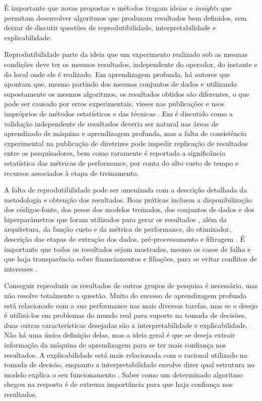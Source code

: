 É importante que novas propostas e métodos tragam ideias e \textit{insights} que permitam desenvolver algoritmos que produzam resultados bem definidos, sem deixar de discutir questões de reprodutibilidade, interpretabilidade e explicabilidade.

Reprodutibilidade parte da ideia que um experimento realizado sob as mesmas condições deve ter os mesmos resultados, independente do operador, do instante e do local onde ele é realizado. Em aprendizagem profunda, há autores que apontam que, mesmo partindo dos mesmos conjuntos de dados e utilizando supostamente os mesmos algoritmos, os resultados obtidos são diferentes, o que pode ser causado por erros experimentais, vieses nas publicações e usos impróprios de métodos estatísticos e das técnicas  \cite{Greengard2019}.   Em \cite{Belthangady2019} é discutido como a validação independente de resultados deveria ser natural nas áreas de aprendizado de máquina e aprendizagem profunda, mas a falta de consistência experimental na publicação de diretrizes pode impedir replicação de resultados entre os pesquisadores, bem como raramente é reportada a significância estatística das métricas de performance, por conta do alto custo de tempo e recursos associados à etapa de treinamento. 

A falta de reprodutibilidade pode ser amenizada com a descrição detalhada da metodologia e obtenção dos resultados. Boas práticas incluem a disponibilização dos códigos-fonte, dos pesos dos modelos treinados, dos conjuntos de dados e dos hiperparâmetros que foram utilizados para gerar os resultados  \cite{Belthangady2019, Greengard2019,  watson2021systematic}, além da arquitetura, da função custo e da métrica de performance, do otimizador, descrição das etapas de extração dos dados, pré-processamento e filtragem \cite{watson2021systematic}. É importante que todos os resultados sejam mostrados, mesmo os casos de falha \cite{Belthangady2019} e que haja transparência sobre financiamentos e filiações, para se evitar conflitos de interesses \cite{Greengard2019}.

Conseguir reproduzir os resultados de outros grupos de pesquisa é necessário, mas não resolve totalmente a questão. Muito do sucesso de aprendizagem profunda está relacionado com a sua performance nas mais diversas tarefas, mas se o desejo é utilizá-los em problemas do mundo real para suporte na tomada de decisões, duas outras características desejadas são a interpretabilidade e explicabilidade. Não há uma única definição delas, mas a ideia geral é que se deseja extrair informação da máquina de aprendizagem para se ter mais confiança nos resultados. A explicabilidade está mais relacionada com o racional utilizado na tomada de decisão, enquanto a interpretabilidade envolve dizer qual estrutura no modelo explica o seu funcionamento \cite{Escalante2018}. Saber como um determinado algoritmo chegou na resposta é de extrema importância para que haja confiança nos resultados. 
 

